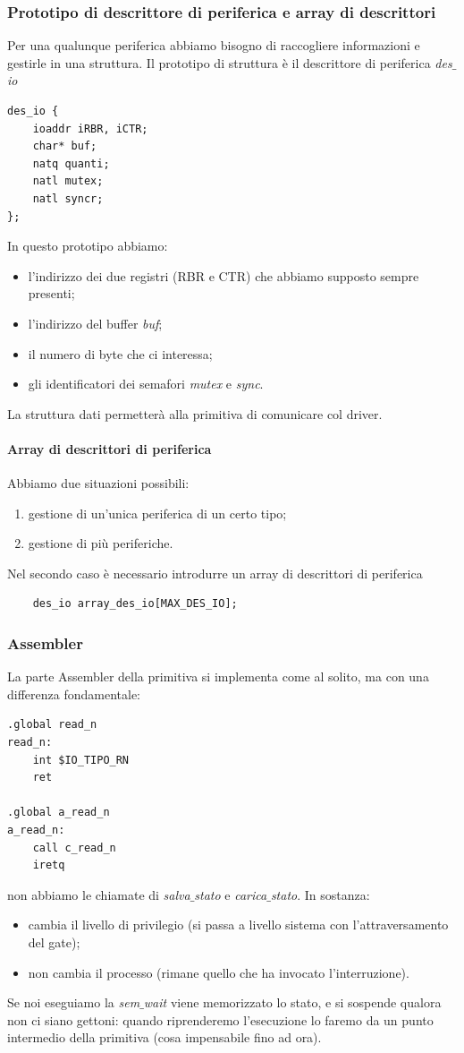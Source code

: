 \documentclass[11pt]{report}
\theoremstyle{definition}
\begin{document}
\subsubsection{Prototipo di descrittore di periferica e array di descrittori} Per una qualunque periferica abbiamo bisogno di raccogliere informazioni e gestirle in una struttura. Il prototipo di struttura è il descrittore di periferica \emph{des$\_$io}
\begin{verbatim}
des_io {
    ioaddr iRBR, iCTR;
    char* buf;
    natq quanti;
    natl mutex;
    natl syncr;
};
\end{verbatim}
In questo prototipo abbiamo:
\begin{itemize}
	\item l'indirizzo dei due registri (RBR e CTR) che abbiamo supposto sempre presenti;
	\item l'indirizzo del buffer \emph{buf};
	\item il numero di byte che ci interessa;
	\item gli identificatori dei semafori \emph{mutex} e \emph{sync}.
\end{itemize}
La struttura dati permetterà alla primitiva di comunicare col driver.
\paragraph{Array di descrittori di periferica}
Abbiamo due situazioni possibili:
\begin{enumerate}
	\item gestione di un'unica periferica di un certo tipo;
	\item gestione di più periferiche.
\end{enumerate} 
Nel secondo caso è necessario introdurre un array di descrittori di periferica
\begin{verbatim}
	des_io array_des_io[MAX_DES_IO];
\end{verbatim}


\subsubsection{Assembler} La parte Assembler della primitiva si implementa come al solito, ma con una differenza fondamentale:
\begin{verbatim}
.global read_n
read_n:
    int $IO_TIPO_RN
    ret
    
.global a_read_n
a_read_n:
    call c_read_n
    iretq
\end{verbatim}
non abbiamo le chiamate di \emph{salva$\_$stato} e \emph{carica$\_$stato}. In sostanza:
\begin{itemize}
	\item cambia il livello di privilegio (si passa a livello sistema con l'attraversamento del gate);
	\item non cambia il processo (rimane quello che ha invocato l'interruzione).
\end{itemize} 
Se noi eseguiamo la \emph{sem$\_$wait} viene memorizzato lo stato, e si sospende qualora non ci siano gettoni: quando riprenderemo l'esecuzione lo faremo da un punto intermedio della primitiva (cosa impensabile fino ad ora).
\end{document}
